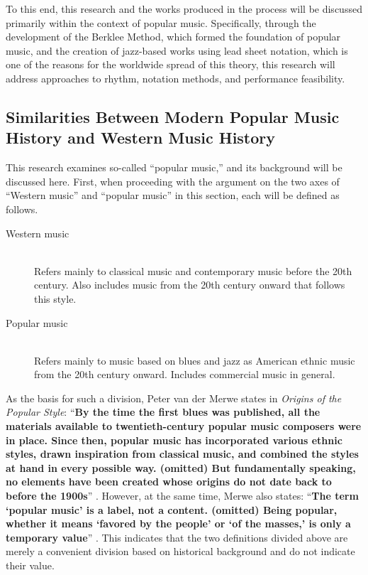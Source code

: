 To this end, this research and the works produced in the process will be discussed primarily within the context of popular music. Specifically, through the development of the Berklee Method, which formed the foundation of popular music, and the creation of jazz-based works using lead sheet notation, which is one of the reasons for the worldwide spread of this theory, this research will address approaches to rhythm, notation methods, and performance feasibility.


\subsection{Similarities Between Modern Popular Music History and Western Music History}

This research examines so-called ``popular music,'' and its background will be discussed here. First, when proceeding with the argument on the two axes of ``Western music'' and ``popular music'' in this section, each will be defined as follows.

\begin{description}
 \item[Western music]\mbox{}\\
	    Refers mainly to classical music and contemporary music before the 20th century. Also includes music from the 20th century onward that follows this style.
 \item[Popular music]\mbox{}\\
	    Refers mainly to music based on blues and jazz as American ethnic music from the 20th century onward. Includes commercial music in general.
\end{description}

As the basis for such a division, Peter van der Merwe states in \textit{Origins of the Popular Style}: ``{\bf By the time the first blues was published, all the materials available to twentieth-century popular music composers were in place. Since then, popular music has incorporated various ethnic styles, drawn inspiration from classical music, and combined the styles at hand in every possible way. (omitted) But fundamentally speaking, no elements have been created whose origins do not date back to before the 1900s}'' \cite{merwe:01}. However, at the same time, Merwe also states: ``{\bf The term `popular music' is a label, not a content. (omitted) Being popular, whether it means `favored by the people' or `of the masses,' is only a temporary value}'' \cite{merwe:01}. This indicates that the two definitions divided above are merely a convenient division based on historical background and do not indicate their value.

